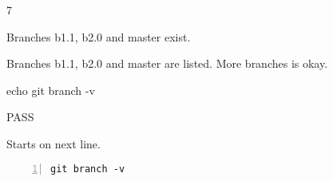 \begin{description}[align=right,leftmargin=3.2cm,labelindent=3.0cm]
\item[Step:] 7
\item[Confirm:] Branches b1.1, b2.0 and master exist.
\item[Expectation:] Branches b1.1, b2.0 and master are listed.  More branches is okay.
\item[Command:] echo git  branch -v
\item[Test Result:] PASS
\item[Evidence:] Starts on next line.
\end{description}
\begin{lstlisting}[numbers=left]
git branch -v

\end{lstlisting}
